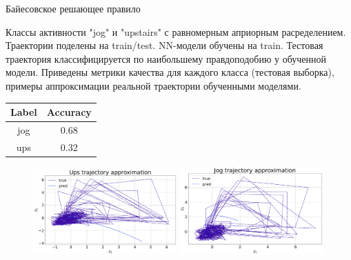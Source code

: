 \documentclass[10pt]{beamer}
\theoremstyle{definition}
\begin{document}
	\begin{frame}{Байесовское решающее правило}
		
		Классы активности "jog" и "upstairs" с равномерным априорным расределением. Траектории поделены на train/test. NN-модели обучены на train. Тестовая траектория классифицируется по наибольшему правдоподобию у обученной модели. Приведены метрики качества для каждого класса (тестовая выборка), примеры аппроксимации реальной траектории обученными моделями.
		
		\begin{table}[]
			\begin{tabular}{|c|c|}
				\hline
				\textbf{Label} & \textbf{Accuracy} \\ \hline
				jog            & 0.68              \\ \hline
				ups            & 0.32              \\ \hline
			\end{tabular}
		\end{table}
		
		\begin{figure}
			\centering
			\includegraphics[width=0.49\textwidth, keepaspectratio]{img/ups_traj_approx.png}
			\includegraphics[width=0.49\textwidth, keepaspectratio]{img/jog_traj_approx.png}
		\end{figure}
		
	\end{frame}
	
\end{document}
